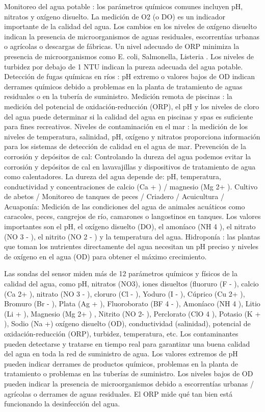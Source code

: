 Monitoreo del agua potable : los parámetros químicos comunes incluyen pH, nitratos y oxígeno disuelto. La medición de O2 (o DO) es un indicador importante de la calidad del agua. Los cambios en los niveles de oxígeno disuelto indican la presencia de microorganismos de aguas residuales, escorrentías urbanas o agrícolas o descargas de fábricas. Un nivel adecuado de ORP minimiza la presencia de microorganismos como  E. coli, Salmonella, Listeria . Los niveles de turbidez por debajo de 1 NTU indican la pureza adecuada del agua potable.
Detección de fugas químicas en ríos : pH extremo o valores bajos de OD indican derrames químicos debido a problemas en la planta de tratamiento de aguas residuales o en la tubería de suministro.
Medición remota de piscinas : la medición del potencial de oxidación-reducción (ORP), el pH y los niveles de cloro del agua puede determinar si la calidad del agua en piscinas y spas es suficiente para fines recreativos.
Niveles de contaminación en el mar : la medición de los niveles de temperatura, salinidad, pH, oxígeno y nitratos proporciona información para los sistemas de detección de calidad en el agua de mar.
Prevención de la corrosión y depósitos de cal:  Controlando la dureza del agua podemos evitar la corrosión y depósitos de cal en lavavajillas y dispositivos de tratamiento de agua como calentadores. La dureza del agua depende de: pH, temperatura, conductividad y concentraciones de calcio (Ca + ) / magnesio (Mg 2+ ).
Cultivo de abetos / Monitoreo de tanques de peces / Criadero / Acuicultura / Acuaponía: Medición de las condiciones del agua de animales acuáticos como caracoles, peces, cangrejos de río, camarones o langostinos en tanques. Los valores importantes son el pH, el oxígeno disuelto (DO), el amoníaco (NH 4 ), el nitrato (NO 3 - ), el nitrito (NO 2 - ) y la temperatura del agua.
Hidroponía : las plantas que toman los nutrientes directamente del agua necesitan un pH preciso y niveles de oxígeno en el agua (OD) para obtener el máximo crecimiento.

Las sondas del sensor miden más de 12 parámetros químicos y físicos de la calidad del agua, como pH, nitratos (NO3), iones disueltos (fluoruro (F - ), calcio (Ca 2+ ), nitrato (NO 3 - ), cloruro (Cl - ), Yoduro (I - ), Cúprico (Cu 2+ ), Bromuro (Br - ), Plata (Ag + ), Fluoroborato (BF 4 - ), Amoníaco (NH 4 ), Litio (Li + ), Magnesio (Mg 2+ ) , Nitrito (NO 2- ), Perclorato (ClO 4 ), Potasio (K + ), Sodio (Na +) oxígeno disuelto (OD), conductividad (salinidad), potencial de oxidación-reducción (ORP), turbidez, temperatura, etc. Los contaminantes pueden detectarse y tratarse en tiempo real para garantizar una buena calidad del agua en toda la red de suministro de agua. Los valores extremos de pH pueden indicar derrames de productos químicos, problemas en la planta de tratamiento o problemas en las tuberías de suministro. Los niveles bajos de OD pueden indicar la presencia de microorganismos debido a escorrentías urbanas / agrícolas o derrames de aguas residuales. El ORP mide qué tan bien está funcionando la desinfección del agua.


